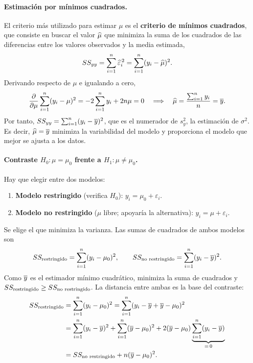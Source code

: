 \paragraph{Estimación por mínimos cuadrados.} El criterio más utilizado para estimar $\mu$ es
el \textbf{criterio de mínimos cuadrados}, que consiste en buscar el valor $\widehat{\mu}$ que
minimiza la suma de los cuadrados de las diferencias entre los valores observados y la media
estimada,
\[
  SS_{yy} = \sum_{i=1}^{n} \widehat{\varepsilon}_i^{\,2} = \sum_{i=1}^{n} (y_i-\widehat{\mu})^2 .
\]
Derivando respecto de $\mu$ e igualando a cero,
\[
  \frac{\partial}{\partial \mu}\sum_{i=1}^{n} (y_i-\mu)^2 = -2\sum_{i=1}^{n} y_i + 2n\mu = 0
  \quad\Longrightarrow\quad
  \widehat{\mu} = \frac{\sum_{i=1}^{n} y_i}{n} = \overline{y} .
\]
Por tanto, $SS_{yy}=\sum_{i=1}^{n} (y_i-\overline{y})^2$, que es el numerador de $s_y^2$, la estimación de
$\sigma^2$. Es decir, $\widehat{\mu}=\overline{y}$ minimiza la variabilidad del modelo y proporciona
el modelo que mejor se ajusta a los datos.

\paragraph{Contraste $H_0\colon \mu=\mu_0$ frente a $H_1\colon \mu\neq\mu_0$.} Hay que elegir
entre dos modelos:
\begin{enumerate}
  \item \textbf{Modelo restringido} (verifica $H_0$): $y_i = \mu_0 + \varepsilon_i$.
  \item \textbf{Modelo no restringido} ($\mu$ libre; apoyaría la alternativa):
    $y_i = \mu + \varepsilon_i$.
\end{enumerate}
Se elige el que minimiza la varianza. Las sumas de cuadrados de ambos modelos son
\[
  SS_{\text{restringido}} = \sum_{i=1}^{n} (y_i-\mu_0)^2, \qquad
  SS_{\text{no restringido}} = \sum_{i=1}^{n} (y_i-\overline{y})^2 .
\]
Como $\overline{y}$ es el estimador mínimo cuadrático, minimiza la suma de cuadrados y
$SS_{\text{restringido}} \ge SS_{\text{no restringido}}$. La distancia entre ambas es la base del contraste:
\begin{align*}
  SS_{\text{restringido}} &= \sum_{i=1}^{n} (y_i-\mu_0)^2 = \sum_{i=1}^{n} (y_i-\overline{y}+\overline{y}-\mu_0)^2 \\
  &= \sum_{i=1}^{n} (y_i-\overline{y})^2 + \sum_{i=1}^{n} (\overline{y}-\mu_0)^2
     + 2(\overline{y}-\mu_0)\underbrace{\sum_{i=1}^{n} (y_i-\overline{y})}_{=\,0} \\
  &= SS_{\text{no restringido}} + n(\overline{y}-\mu_0)^2 .
\end{align*}

